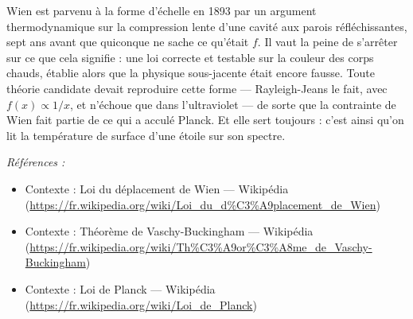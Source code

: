 \documentclass[11pt]{article}
\newenvironment{refs}{\par\small\noindent\emph{Références :}\begin{itemize}\setlength\itemsep{0pt}}{\end{itemize}\normalsize}
\begin{document}
\noindent Wien est parvenu à la forme d'échelle en 1893 par un argument thermodynamique
sur la compression lente d'une cavité aux parois réfléchissantes, sept ans avant que quiconque ne
sache ce qu'était $f$. Il vaut la peine de s'arrêter sur ce que cela signifie : une loi correcte
et testable sur la couleur des corps chauds, établie alors que la physique sous-jacente était
encore fausse. Toute théorie candidate devait reproduire cette forme --- Rayleigh-Jeans le fait,
avec $f(x) \propto 1/x$, et n'échoue que dans l'ultraviolet --- de sorte que la contrainte de Wien
fait partie de ce qui a acculé Planck. Et elle sert toujours : c'est ainsi qu'on lit la
température de surface d'une étoile sur son spectre.

\begin{refs}
\item Contexte : Loi du déplacement de Wien --- Wikipédia (\url{https://fr.wikipedia.org/wiki/Loi_du_d%C3%A9placement_de_Wien})
\item Contexte : Théorème de Vaschy-Buckingham --- Wikipédia (\url{https://fr.wikipedia.org/wiki/Th%C3%A9or%C3%A8me_de_Vaschy-Buckingham})
\item Contexte : Loi de Planck --- Wikipédia (\url{https://fr.wikipedia.org/wiki/Loi_de_Planck})
\end{refs}

\bigskip
\end{document}
